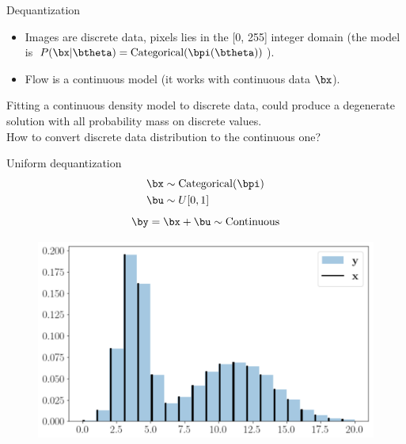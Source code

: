 \begin{frame}{Dequantization}
	\begin{itemize}
		\item Images are discrete data, pixels lies in the [0, 255] integer domain (the model is $P(\bx | \btheta) = \text{Categorical}(\bpi(\btheta))$).
		\item Flow is a continuous model (it works with continuous data $\bx$).
	\end{itemize}
	Fitting a continuous density model to discrete data, could produce a degenerate solution with all probability mass on discrete values. \\
	How to convert discrete data distribution to the continuous one?
	
	\begin{minipage}[t]{0.5\columnwidth}
		\begin{block}{Uniform dequantization}
		\vspace{-0.5cm}
			\begin{align*}
				\bx &\sim \text{Categorical}(\bpi) \\
				 \bu &\sim U[0, 1]
			\end{align*}
			\[
			\by = \bx + \bu \sim \text{Continuous} 
			\]
		\end{block}
	\end{minipage}%
	\begin{minipage}[t]{0.5\columnwidth}
		\begin{figure}
			\centering
			\includegraphics[width=1.0\linewidth]{figs/uniform_dequantization.png}
		\end{figure}
	\end{minipage}
\end{frame}
